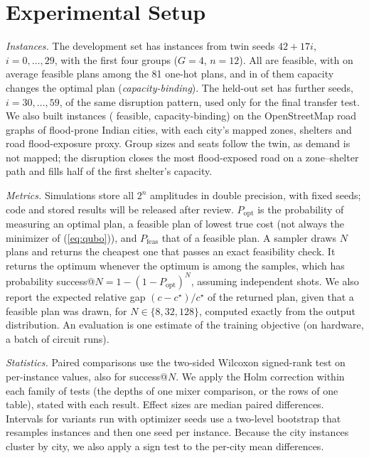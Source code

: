 \documentclass[conference]{IEEEtran}
\begin{document}
\section{Experimental Setup}\label{sec:setup}
\textit{Instances.} The development set has \NInst{} instances from twin seeds $42+17i$, $i=0,\dots,29$, with the first four groups ($G=4$, $n=12$). All are feasible, with on average \MeanFeasAssign{} feasible plans among the 81 one-hot plans, and in \NBinding{} of them capacity changes the optimal plan (\emph{capacity-binding}). The held-out set has \HoN{} further seeds, $i=30,\dots,59$, of the same disruption pattern, used only for the final transfer test. We also built \CityAll{} instances (\CityN{} feasible, \CityBinding{} capacity-binding) on the OpenStreetMap road graphs of \CityNCities{} flood-prone Indian cities, with each city's mapped zones, shelters and road flood-exposure proxy. Group sizes and seats follow the twin, as demand is not mapped; the disruption closes the most flood-exposed road on a zone--shelter path and fills half of the first shelter's capacity.

\textit{Metrics.} Simulations store all $2^n$ amplitudes in double precision, with fixed seeds; code and stored results will be released after review. $P_{\mathrm{opt}}$ is the probability of measuring an optimal plan, a feasible plan of lowest true cost (not always the minimizer of (\ref{eq:qubo})), and $P_{\mathrm{feas}}$ that of a feasible plan. A sampler draws $N$ plans and returns the cheapest one that passes an exact feasibility check. It returns the optimum whenever the optimum is among the samples, which has probability success@$N=1-(1-P_{\mathrm{opt}})^N$, assuming independent shots. We also report the expected relative gap $(c-c^\star)/c^\star$ of the returned plan, given that a feasible plan was drawn, for $N\in\{8,32,128\}$, computed exactly from the output distribution. An evaluation is one estimate of the training objective (on hardware, a batch of circuit runs).

\textit{Statistics.} Paired comparisons use the two-sided Wilcoxon signed-rank test on per-instance values, also for success@$N$. We apply the Holm correction within each family of tests (the depths of one mixer comparison, or the rows of one table), stated with each result. Effect sizes are median paired differences. Intervals for variants run with \NSeeds{} optimizer seeds use a two-level bootstrap that resamples instances and then one seed per instance. Because the city instances cluster by city, we also apply a sign test to the per-city mean differences.
\end{document}
